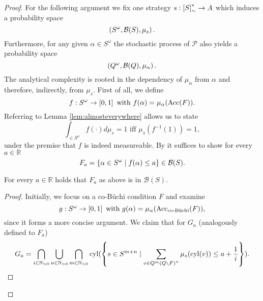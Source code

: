 \begin{proof}
  For the following argument we fix one strategy 
  $s:\left[S\right]_{\sim}^{*}\rightarrow A$ which induces a probability space
  \begin{equation*}
    \left(S^{\omega},\mathcal{B}(S), \mu_{s}\right).
  \end{equation*}
  Furthermore, for any given $\alpha\in S^{\omega}$ the stochastic process of
  $\mathcal{P}$ also yields a probability space
  \begin{equation*}
    \left(Q^{\omega},\mathcal{B}(Q), \mu_{\alpha}\right).
  \end{equation*}
  The analytical complexity is rooted in the dependency of $\mu_{\alpha}$ from
  $\alpha$ and therefore, indirectly, from $\mu_{s}$. First of all, we define
  \begin{equation*}
    f:S^{\omega}\rightarrow\left[0,1\right]\text{ with }f(\alpha) = 
      \mu_{\alpha}(\operatorname{Acc}(F)).
  \end{equation*}
  Referring to Lemma \ref{lem:almosteverywhere} allows us to state
  \begin{equation*}
    \int_{\in S^{\omega}}f(\cdot) d\mu_{s} = 1 \text{ iff }
      \mu_{s}(f^{-1}(1)) = 1,
  \end{equation*}
  under the premise that $f$ is indeed measureable. By \cite[]{Bauer} it 
  suffices to show for every $a\in\mathbb{R}$ 
  \begin{equation*}
    F_{a} = \left\{\alpha\in S^{\omega}\mid f(\alpha)\leq a\right\}\in\mathcal{B}(S).
  \end{equation*}
  \begin{lemma}
    For every $a\in\mathbb{R}$ holds that $F_{a}$ as above is in 
    $\mathcal{B}(S)$.
  \end{lemma}
  \begin{proof}
    Initially, we focus on a co-Büchi condition $F$ and examine
    \begin{equation*}
      g:S^{\omega}\rightarrow\left[0,1\right]\text{ with }
      g(\alpha) = \mu_{\alpha}(\operatorname{Acc}_{\operatorname{co-B\ddot{u}chi}}(F)),
    \end{equation*}
    since it forms a more concise argument. We claim that for $G_{a}$ 
    (analogously defined to $F_{a}$)
    \begin{equation}
      G_{a} = \bigcap_{i\in\mathbb{N}_{>0}}\bigcup_{n\in\mathbb{N}_{>0}}
        \bigcap_{m\in\mathbb{N}_{>0}}\operatorname{cyl}(\left\{s\in S^{m+n}\mid
        \sum\limits_{v\in Q^{m}\left(Q\setminus F\right)^{n}}\mu_{s}(\operatorname{cyl}(v))\leq 
          a+\frac{1}{i}\right\}).
      \label{eq:Ga}
    \end{equation}

\end{proof}
\end{proof}
